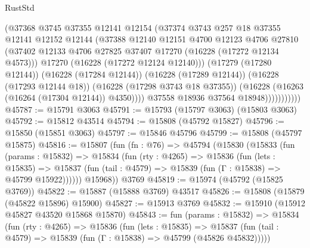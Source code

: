 \begin{lexlean}{RustStd}
\begin{coremodule}
                          (@37368
                            @3745
                            @37355
                            @12141
                            @12154
                            (@37374
                              @3743
                              @257
                              @18
                              @37355
                              @12141
                              @12152
                              @12144
                              (@37388
                                @12140
                                @12151
                                @4700
                                @12123
                                @4706
                                @27810
                                (@37402
                                  @12133
                                  @4706
                                  @27825
                                  @37407
                                  @17270
                                  (@16228 (@17272 @12134 @4573)))
                                @17270
                                (@16228 (@17272 @12124 @12140)))
                              (@17279 (@17280 @12144))
                              (@16228 (@17284 @12144))
                              (@16228 (@17289 @12144))
                              (@16228 (@17293 @12144 @18))
                              (@16228 (@17298 @3743 @18 @37355))
                              (@16228 (@16263 (@16264 (@17304 @12144)) @4350))))
                          @37558
                          @18936
                          @37564
                          @18948)))))))))))
@45787 := @15791 @3063
@45791 := @15793 (@15797 @3063) (@15803 @3063)
@45792 := @15812 @43514
@45794 := @15808 (@45792 @15827)
@45796 := @15850 (@15851 @3063)
@45797 := @15846 @45796
@45799 := @15808 (@45797 @15875)
@45816 := @15807
    (fun (fn : @76) =>
    @45794
      (@15830
        (@15833
          (fun (params : @15832) =>
          @15834
            (fun (rty : @4265) =>
            @15836
              (fun (lets : @15835) =>
              @15837 (fun (tail : @4579) => @15839 (fun (Γ : @15838) => @45799 @15922))))))
        @15968))
    @3769
@45819 := @15974 (@45792 (@15825 @3769))
@45822 := @15887 (@15888 @3769) @43517
@45826 := @15808 (@15879 (@45822 @15896) @15900)
@45827 := @15913 @3769
@45832 := @15910 (@15912 @45827 @43520 @15868 @15870)
@45843 := fun (params : @15832) =>
  @15834
    (fun (rty : @4265) =>
    @15836
      (fun (lets : @15835) =>
      @15837 (fun (tail : @4579) => @15839 (fun (Γ : @15838) => @45799 (@45826 @45832)))))

\end{coremodule}
\end{lexlean}
